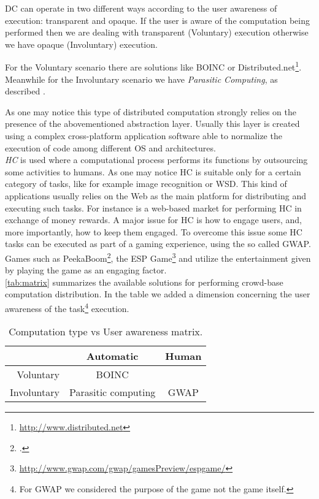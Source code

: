 \ac{DC} can operate in two different ways according to the user awareness
of execution: transparent and opaque. If the user is aware of the computation
being performed then we are dealing with transparent (Voluntary) execution
otherwise we have opaque (Involuntary) execution.

For the Voluntary scenario there are solutions like \ac{BOINC} or
Distributed.net\footnote{\url{http://www.distributed.net}}. Meanwhile
for the Involuntary scenario we have \emph{Parasitic Computing}, as described
\cite{barabasi2001parasitic}.

As one may notice this type of distributed computation strongly relies on the
presence of the abovementioned abstraction layer. Usually this layer is
created using a complex cross-platform application software able to normalize
the execution of code among different OS and architectures.\\






\emph{\acl{HC}} is used  where a computational process performs its
functions by outsourcing some activities to humans. As one may notice \ac{HC}
is suitable only for a certain category of tasks, like for example image
recognition or \acl{WSD}. This kind of applications usually relies on the Web
as the main platform for distributing and executing such tasks. For instance
 is a web-based market for performing \ac{HC} in exchange of
money rewards.
A major issue for \ac{HC} is how to engage users, and, more importantly, how to keep
them engaged. To overcome this issue some \ac{HC} tasks can be executed as part of
a gaming experience, using the so called \ac{GWAP}.
Games such as PeekaBoom\footcite{von2006peekaboom}, the
ESP Game\footnote{\url{http://www.gwap.com/gwap/gamesPreview/espgame/}} and
 utilize the entertainment given by playing the game as an
engaging factor.\\



\autoref{tab:matrix} summarizes the available solutions for performing crowd-base
computation distribution. In the table we added a dimension concerning the user
awareness of the task\footnote{For \ac{GWAP} we considered the purpose of the
game not the game itself.} execution.
\begin{table}[htb]
	\caption{Computation type vs User awareness matrix.}
	\label{tab:matrix}
	\centering
	\begin{tabular}{r|c|c}
		 & \textbf{Automatic} & \textbf{Human}\\
		\hline
		Voluntary & \acs{BOINC} & \citetitle{turk}\\
		\hline
		Involuntary & Parasitic computing & \acs{GWAP}
	\end{tabular}
\end{table}




